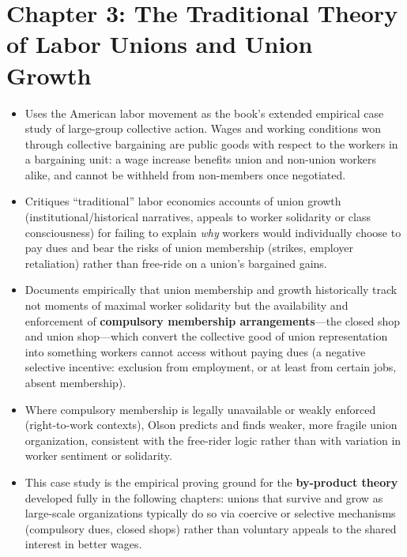 \documentclass[12pt]{article}
\begin{document}
\section{Chapter 3: The Traditional Theory of Labor Unions and Union Growth}

\begin{itemize}[leftmargin=*, itemsep=4pt]
    \item Uses the American labor movement as the book's extended empirical case study of large-group collective action. Wages and working conditions won through collective bargaining are public goods with respect to the workers in a bargaining unit: a wage increase benefits union and non-union workers alike, and cannot be withheld from non-members once negotiated.
    \item Critiques ``traditional'' labor economics accounts of union growth (institutional/historical narratives, appeals to worker solidarity or class consciousness) for failing to explain \emph{why} workers would individually choose to pay dues and bear the risks of union membership (strikes, employer retaliation) rather than free-ride on a union's bargained gains.
    \item Documents empirically that union membership and growth historically track not moments of maximal worker solidarity but the availability and enforcement of \textbf{compulsory membership arrangements}---the closed shop and union shop---which convert the collective good of union representation into something workers cannot access without paying dues (a negative selective incentive: exclusion from employment, or at least from certain jobs, absent membership).
    \item Where compulsory membership is legally unavailable or weakly enforced (right-to-work contexts), Olson predicts and finds weaker, more fragile union organization, consistent with the free-rider logic rather than with variation in worker sentiment or solidarity.
    \item This case study is the empirical proving ground for the \textbf{by-product theory} developed fully in the following chapters: unions that survive and grow as large-scale organizations typically do so via coercive or selective mechanisms (compulsory dues, closed shops) rather than voluntary appeals to the shared interest in better wages.
\end{itemize}

\end{document}
